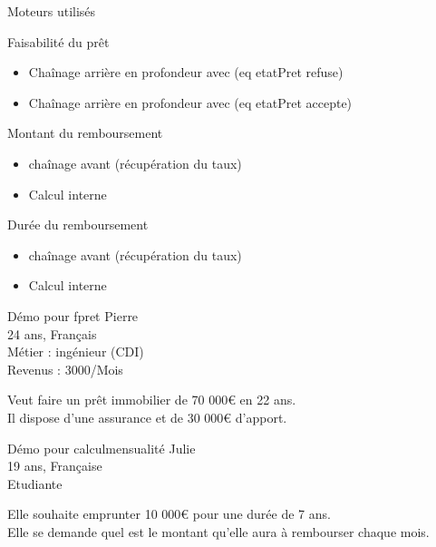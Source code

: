 \documentclass[
  ignorenonframetext,
]{beamer}
\providecommand{\tightlist}{%
  \setlength{\itemsep}{0pt}\setlength{\parskip}{0pt}}
\begin{document}
\begin{frame}{Moteurs utilisés}
\protect\hypertarget{moteurs-utilisuxe9s}{}
\begin{block}{Faisabilité du prêt}
\protect\hypertarget{faisabilituxe9-du-pruxeat}{}
\begin{itemize}
\tightlist
\item
  Chaînage arrière en profondeur avec (eq etatPret refuse)
\item
  Chaînage arrière en profondeur avec (eq etatPret accepte)
\end{itemize}
\end{block}

\begin{block}{Montant du remboursement}
\protect\hypertarget{montant-du-remboursement}{}
\begin{itemize}
\tightlist
\item
  chaînage avant (récupération du taux)
\item
  Calcul interne
\end{itemize}
\end{block}

\begin{block}{Durée du remboursement}
\protect\hypertarget{duruxe9e-du-remboursement}{}
\begin{itemize}
\tightlist
\item
  chaînage avant (récupération du taux)
\item
  Calcul interne
\end{itemize}
\end{block}
\end{frame}

\begin{frame}{Démo pour fpret}
\protect\hypertarget{duxe9mo-pour-fpret}{}
Pierre\\
24 ans, Français\\
Métier : ingénieur (CDI)\\
Revenus : 3000/Mois

Veut faire un prêt immobilier de 70 000€ en 22 ans.\\
Il dispose d'une assurance et de 30 000€ d'apport.
\end{frame}

\begin{frame}{Démo pour calculmensualité}
\protect\hypertarget{duxe9mo-pour-calculmensualituxe9}{}
Julie\\
19 ans, Française\\
Etudiante

Elle souhaite emprunter 10 000€ pour une durée de 7 ans.\\
Elle se demande quel est le montant qu'elle aura à rembourser chaque
mois.
\end{frame}
\end{document}
